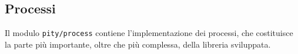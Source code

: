 \subsection{Processi}

Il modulo \lstinline{pity/process} contiene l'implementazione dei
processi, che costituisce la parte pi\`u importante, oltre che pi\`u
complessa, della libreria sviluppata.


